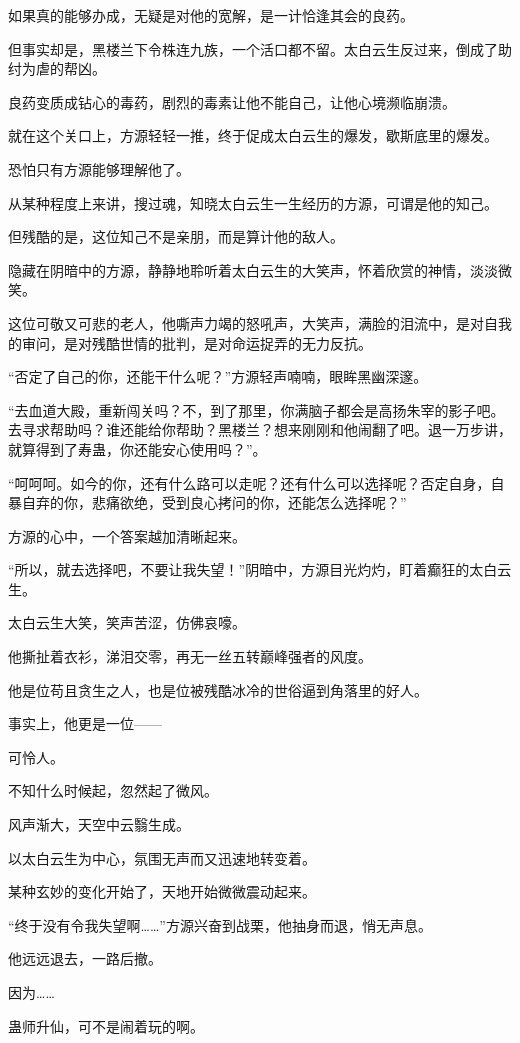 \begin{this_body}
如果真的能够办成，无疑是对他的宽解，是一计恰逢其会的良药。

但事实却是，黑楼兰下令株连九族，一个活口都不留。太白云生反过来，倒成了助纣为虐的帮凶。

良药变质成钻心的毒药，剧烈的毒素让他不能自己，让他心境濒临崩溃。

就在这个关口上，方源轻轻一推，终于促成太白云生的爆发，歇斯底里的爆发。

恐怕只有方源能够理解他了。

从某种程度上来讲，搜过魂，知晓太白云生一生经历的方源，可谓是他的知己。

但残酷的是，这位知己不是亲朋，而是算计他的敌人。

隐藏在阴暗中的方源，静静地聆听着太白云生的大笑声，怀着欣赏的神情，淡淡微笑。

这位可敬又可悲的老人，他嘶声力竭的怒吼声，大笑声，满脸的泪流中，是对自我的审问，是对残酷世情的批判，是对命运捉弄的无力反抗。

“否定了自己的你，还能干什么呢？”方源轻声喃喃，眼眸黑幽深邃。

“去血道大殿，重新闯关吗？不，到了那里，你满脑子都会是高扬朱宰的影子吧。去寻求帮助吗？谁还能给你帮助？黑楼兰？想来刚刚和他闹翻了吧。退一万步讲，就算得到了寿蛊，你还能安心使用吗？”。

“呵呵呵。如今的你，还有什么路可以走呢？还有什么可以选择呢？否定自身，自暴自弃的你，悲痛欲绝，受到良心拷问的你，还能怎么选择呢？”

方源的心中，一个答案越加清晰起来。

“所以，就去选择吧，不要让我失望！”阴暗中，方源目光灼灼，盯着癫狂的太白云生。

太白云生大笑，笑声苦涩，仿佛哀嚎。

他撕扯着衣衫，涕泪交零，再无一丝五转巅峰强者的风度。

他是位苟且贪生之人，也是位被残酷冰冷的世俗逼到角落里的好人。

事实上，他更是一位——

可怜人。

不知什么时候起，忽然起了微风。

风声渐大，天空中云翳生成。

以太白云生为中心，氛围无声而又迅速地转变着。

某种玄妙的变化开始了，天地开始微微震动起来。

“终于没有令我失望啊……”方源兴奋到战栗，他抽身而退，悄无声息。

他远远退去，一路后撤。

因为……

蛊师升仙，可不是闹着玩的啊。


\end{this_body}
